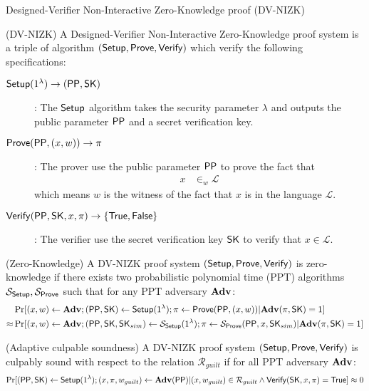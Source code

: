 \begin{subsection}{Designed-Verifier Non-Interactive Zero-Knowledge proof (DV-NIZK)}

  \begin{definition}{(DV-NIZK)} A Designed-Verifier Non-Interactive Zero-Knowledge proof system is a triple of algorithm $({\mathsf{Setup}}, {\mathsf{Prove}}, {\mathsf{Verify}})$ which verify the following specifications:
    \begin{description}
    \item[${\mathsf{Setup}}(1^\lambda) \to ({\mathsf{PP}}, \mathsf{SK})$]: The ${\mathsf{Setup}}$ algorithm takes the security parameter $\lambda$ and outputs the public parameter ${\mathsf{PP}}$ and a secret verification key.
    \item[${\mathsf{Prove}}({\mathsf{PP}}, (x, w)) \to \pi$]: The prover use the public parameter ${\mathsf{PP}}$ to prove the fact that
      \begin{align*}
        x &\in_w \mathcal{L}
      \end{align*}
      which means $w$ is the witness of the fact that $x$ is in the language $\mathcal{L}$.
    \item[${\mathsf{Verify}}({\mathsf{PP}}, \mathsf{SK}, x, \pi) \to \{\mathsf{True}, \mathsf{False}\}$]: The verifier use the secret verification key $\mathsf{SK}$ to verify that $x \in \mathcal{L}$. 
    \end{description}
  \end{definition}

  \begin{definition}{(Zero-Knowledge)}
    A DV-NIZK proof system $({\mathsf{Setup}}, {\mathsf{Prove}}, {\mathsf{Verify}})$ is zero-knowledge if there exists two probabilistic polynomial time (PPT) algorithms $\mathcal{S}_{{\mathsf{Setup}}}, \mathcal{S}_{{\mathsf{Prove}}}$ such that for any PPT adversary $\mathbf{Adv}$:
    \begin{align*}
      &\Pr[(x, w) \gets \mathbf{Adv}; ({\mathsf{PP}},\mathsf{SK}) \gets {\mathsf{Setup}}(1^\lambda); \pi \gets {\mathsf{Prove}}({\mathsf{PP}}, (x,w)) | \mathbf{Adv}(\pi, \mathsf{SK}) = 1]\\
      \approx &\Pr[(x, w) \gets \mathbf{Adv}; ({\mathsf{PP}},\mathsf{SK}, \mathsf{SK}_{sim}) \gets \mathcal{S}_{{\mathsf{Setup}}}(1^\lambda); \pi \gets \mathcal{S}_{{\mathsf{Prove}}}({\mathsf{PP}}, x, \mathsf{SK}_{sim}) | \mathbf{Adv}(\pi, \mathsf{SK}) = 1]
    \end{align*}
  \end{definition}



  \begin{definition}{(Adaptive culpable soundness)}
    A DV-NIZK proof system $({\mathsf{Setup}}, {\mathsf{Prove}}, {\mathsf{Verify}})$ is culpably sound with respect to the relation $\mathcal{R}_{guilt}$ if for all PPT adversary $\mathbf{Adv}$:
    \begin{align*}
      \Pr[({\mathsf{PP}}, \mathsf{SK}) \gets {\mathsf{Setup}}(1^{\lambda}); (x, \pi, w_{guilt}) \gets \mathbf{Adv}({\mathsf{PP}}) | (x, w_{guilt}) \in \mathcal{R}_{guilt} \wedge {\mathsf{Verify}}(\mathsf{SK}, x, \pi) = \mathsf{True}] \approx 0
    \end{align*}
  \end{definition}

  
\end{subsection}
